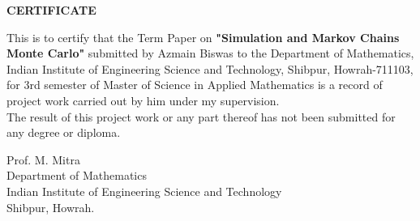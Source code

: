 \vspace{10cm}
\begin{center}
    \LARGE{\textbf{CERTIFICATE}}
\end{center}
\vspace*{2cm}
This is to certify that the Term Paper on \textbf{"Simulation and Markov Chains Monte Carlo"} submitted by Azmain Biswas to the Department of Mathematics, Indian Institute of Engineering Science and Technology, Shibpur, Howrah-711103, for 3rd semester of Master of Science in Applied Mathematics is a record of project work carried out by him under my supervision. \\
The result of this project work or any part thereof has not been submitted for any degree or diploma.
\vspace{4cm}
\begin{flushright}
    Prof. M. Mitra\\
    Department of Mathematics\\
    Indian Institute of Engineering Science and Technology\\
    Shibpur, Howrah.
\end{flushright}
